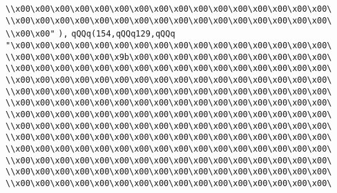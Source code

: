 \verb|\\x00\x00\x00\x00\x00\x00\x00\x00\x00\x00\x00\x00\x00\x00\x00\x00\|\newline
\verb|\\x00\x00\x00\x00\x00\x00\x00\x00\x00\x00\x00\x00\x00\x00\x00\x00\|\newline
\verb|\\x00\x00"|\newline
\verb|),|\newline
\verb|qQQq(154,qQQq129,qQQq|\newline
\verb|"\x00\x00\x00\x00\x00\x00\x00\x00\x00\x00\x00\x00\x00\x00\x00\x00\|\newline
\verb|\\x00\x00\x00\x00\x00\x9b\x00\x00\x00\x00\x00\x00\x00\x00\x00\x00\|\newline
\verb|\\x00\x00\x00\x00\x00\x00\x00\x00\x00\x00\x00\x00\x00\x00\x00\x00\|\newline
\verb|\\x00\x00\x00\x00\x00\x00\x00\x00\x00\x00\x00\x00\x00\x00\x00\x00\|\newline
\verb|\\x00\x00\x00\x00\x00\x00\x00\x00\x00\x00\x00\x00\x00\x00\x00\x00\|\newline
\verb|\\x00\x00\x00\x00\x00\x00\x00\x00\x00\x00\x00\x00\x00\x00\x00\x00\|\newline
\verb|\\x00\x00\x00\x00\x00\x00\x00\x00\x00\x00\x00\x00\x00\x00\x00\x00\|\newline
\verb|\\x00\x00\x00\x00\x00\x00\x00\x00\x00\x00\x00\x00\x00\x00\x00\x00\|\newline
\verb|\\x00\x00\x00\x00\x00\x00\x00\x00\x00\x00\x00\x00\x00\x00\x00\x00\|\newline
\verb|\\x00\x00\x00\x00\x00\x00\x00\x00\x00\x00\x00\x00\x00\x00\x00\x00\|\newline
\verb|\\x00\x00\x00\x00\x00\x00\x00\x00\x00\x00\x00\x00\x00\x00\x00\x00\|\newline
\verb|\\x00\x00\x00\x00\x00\x00\x00\x00\x00\x00\x00\x00\x00\x00\x00\x00\|\newline
\verb|\\x00\x00\x00\x00\x00\x00\x00\x00\x00\x00\x00\x00\x00\x00\x00\x00\|\newline

